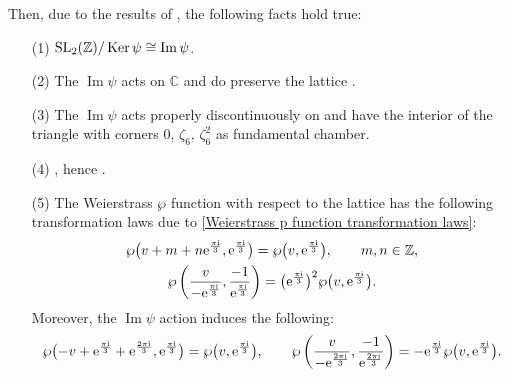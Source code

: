 \documentclass[11pt]{article}
\numberwithin{equation}{section}
\numberwithin{equation}{section}
\begin{document}
Then, due to the results of \cite[Section 1 and 2]{M.Batchelor}, the following facts hold true:
\begin{enumerate}\itemsep=0pt
\item[(1)] ${\rm SL}_2(\mathbb{Z})/\operatorname{Ker}\psi\cong \operatorname{Im}\psi$.
\item[(2)] The $\operatorname{Im}\psi$ acts on $\mathbb{C}$ and do preserve the lattice .
\item[(3)] The $\operatorname{Im}\psi$ acts properly discontinuously on  and have the interior of the triangle with corners $0$, $\zeta_6$, $\zeta_6^2$ as fundamental chamber.
\item[(4)] , hence .
\item[(5)] The Weierstrass $\wp$ function with respect to the lattice  has the following transformation laws due to \eqref{Weierstrass p function transformation laws}:
 \begin{gather*}
\wp\bigl(v+m+n{\rm e}^{\frac{\pi {\rm i}}{3}},{\rm e}^{\frac{\pi {\rm i}}{3}}\bigr)=\wp\bigl(v,{\rm e}^{\frac{\pi {\rm i}}{3}}\bigr),\qquad m,n \in\mathbb{Z},\\
\wp\left(\frac{v}{-{\rm e}^{\frac{\pi {\rm i}}{3}}},\frac{-1}{{\rm e}^{\frac{\pi {\rm i}}{3}}}\right)=\bigl({\rm e}^{\frac{\pi {\rm i}}{3}}\bigr)^2\wp\bigl(v,{\rm e}^{\frac{\pi {\rm i}}{3}}\bigr).
\end{gather*}
Moreover, the $\operatorname{Im} \psi$ action induces the following:
 \begin{gather*}
\wp\bigl(-v+{\rm e}^{\frac{\pi {\rm i}}{3}}+{\rm e}^{\frac{2\pi {\rm i}}{3}},{\rm e}^{\frac{\pi {\rm i}}{3}}\bigr)=\wp\bigl(v,{\rm e}^{\frac{\pi {\rm i}}{3}}\bigr),\qquad
\wp\left(\frac{v}{-{\rm e}^{\frac{2\pi {\rm i}}{3}}},\frac{-1}{{\rm e}^{\frac{2\pi {\rm i}}{3}}}\right)=-{\rm e}^{\frac{\pi {\rm i}}{3}}\wp\bigl(v,{\rm e}^{\frac{\pi {\rm i}}{3}}\bigr).
\end{gather*}


\end{enumerate}
\end{document}
